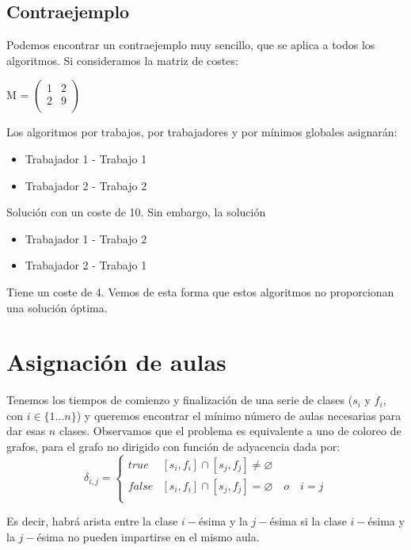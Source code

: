 \documentclass[a4paper, 11pt]{article} %
\let\emptyset\varnothing
\begin{document}
	\subsection{Contraejemplo}
	Podemos encontrar un contraejemplo muy sencillo, que se aplica a todos los algoritmos. Si consideramos la matriz de costes:
	
	\centering
	M = $\begin{pmatrix}
	    		1 & 2\\
	    		2 & 9\\
	\end{pmatrix}$
	\flushleft
	
	Los algoritmos por trabajos, por trabajadores y por mínimos globales asignarán: 
	\begin{itemize}
	\item{Trabajador 1 - Trabajo 1}
	\item{Trabajador 2 - Trabajo 2}
	\end{itemize}
		
	Solución con un coste de 10. Sin embargo, la solución 
		
	\begin{itemize}
	\item{Trabajador 1 - Trabajo 2}
	\item{Trabajador 2 - Trabajo 1}
	\end{itemize}
	  
	Tiene un coste de 4. Vemos de esta forma que estos algoritmos no proporcionan una solución óptima. 
	

\section{Asignación de aulas}
Tenemos los tiempos de comienzo y finalización de una serie de clases
($s_i$ y $f_i$, con $i\in\{1\ldots n\}$) y queremos encontrar el mínimo número de aulas necesarias
para dar esas $n$ clases.
Observamos que el problema es equivalente a uno de coloreo de grafos, para
el grafo no dirigido con función de adyacencia dada por:
$$\delta_{i,j}=\left\{\begin{array}{ll}
  true  & [s_i,f_i] \cap [s_j,f_j] \neq \emptyset \\
  false  & [s_i,f_i]\cap[s_j,f_j] = \emptyset\quad o\quad i=j\\
  \end{array}\right.$$

Es decir, habrá arista entre la clase $i-$ésima y la $j-$ésima si la
clase $i-$ésima y la $j-$ésima no pueden impartirse en el mismo aula.
\end{document}
